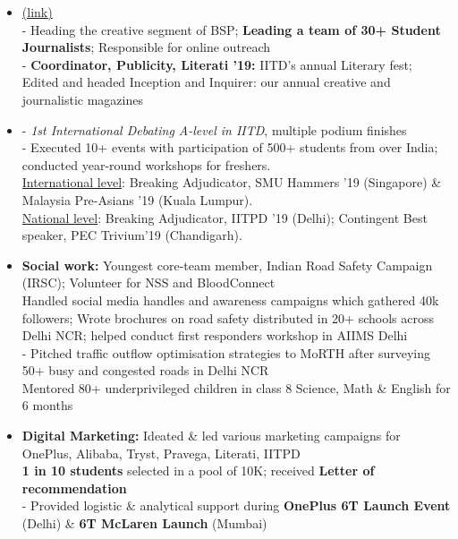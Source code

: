 \documentclass{article}
\begin{document}
\begin{itemize}
    \setlength\itemsep{0em}
    
    \item \underline{} \href{http://bsp.iitd.ac.in/}{(link)}\\
    - Heading the creative segment of BSP; \textbf{Leading a team of 30+ Student Journalists}; Responsible for online outreach \\
    - \textbf{Coordinator, Publicity, Literati '19:} IITD's annual Literary fest; Edited and headed Inception and Inquirer: our annual creative and journalistic magazines
    
    \item \underline{} - \textit{1st International Debating A-level in IITD}, multiple podium finishes \\
    - Executed 10+ events with participation of 500+ students from over India; conducted year-round workshops for freshers.\\
    \underline{International level}: Breaking Adjudicator, SMU Hammers '19 (Singapore) \& Malaysia Pre-Asians '19 (Kuala Lumpur).\\
    \underline{National level}: Breaking Adjudicator, IITPD '19 (Delhi); Contingent Best speaker, PEC Trivium'19 (Chandigarh).
    
    \item \textbf{Social work:} Youngest core-team member, Indian Road Safety Campaign (IRSC); Volunteer for NSS and BloodConnect\\
    \underline{} Handled social media handles and awareness campaigns which gathered 40k followers; Wrote brochures on road safety distributed in 20+ schools across Delhi NCR; helped conduct first responders workshop in AIIMS Delhi \\
    - Pitched traffic outflow optimisation strategies to MoRTH after surveying 50+ busy and congested roads in Delhi NCR\\
    \underline{} Mentored 80+ underprivileged children in class 8 Science, Math \& English for 6 months

    \item \textbf{Digital Marketing:} Ideated \& led various marketing campaigns for OnePlus, Alibaba, Tryst, Pravega, Literati, IITPD\\
    \underline{} \textbf{1 in 10 students} selected in a pool of 10K; received \textbf{Letter of recommendation}\\
    - Provided logistic \& analytical support during \textbf{OnePlus 6T Launch Event} (Delhi) \& \textbf{6T McLaren Launch} (Mumbai)
    

\end{itemize}
\end{document}
